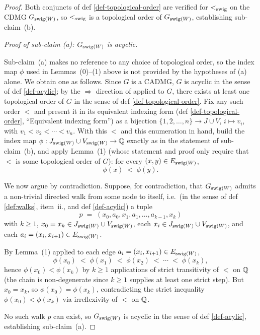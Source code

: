 \documentclass[main]{subfiles}
\begin{document}
\begin{proof}
Both conjuncts of def \ref{def-topological-order} are verified for $<_{\mathrm{swig}}$ on the CDMG $G_{\mathrm{swig}(W)}$, so $<_{\mathrm{swig}}$ is a topological order of $G_{\mathrm{swig}(W)}$, establishing sub-claim~(b).

\medskip\noindent\emph{Proof of sub-claim (a): $G_{\mathrm{swig}(W)}$ is acyclic.}

Sub-claim~(a) makes no reference to any choice of topological order, so the index map $\phi$ used in Lemmas~(0)--(1) above is not provided by the hypotheses of (a) alone. We obtain one as follows. Since $G$ is a CADMG, $G$ is acyclic in the sense of def \ref{def-acylic}; by the $\Rightarrow$ direction of  applied to $G$, there exists at least one topological order of $G$ in the sense of def \ref{def-topological-order}. Fix any such order $<$ and present it in its equivalent indexing form (def \ref{def-topological-order}, ``Equivalent indexing form'') as a bijection $\{1, 2, \dots, n\} \to J \cup V$, $i \mapsto v_i$, with $v_1 < v_2 < \cdots < v_n$. With this $<$ and this enumeration in hand, build the index map $\phi : J_{\mathrm{swig}(W)} \cup V_{\mathrm{swig}(W)} \to \mathbb{Q}$ exactly as in the statement of sub-claim~(b), and apply Lemma~(1) (whose statement and proof only require that $<$ is some topological order of $G$): for every $(x, y) \in E_{\mathrm{swig}(W)}$,
\[
    \phi(x) \;<\; \phi(y).
\]

We now argue by contradiction. Suppose, for contradiction, that $G_{\mathrm{swig}(W)}$ admits a non-trivial directed walk from some node to itself, i.e.\ (in the sense of def \ref{def:walks}, item~ii., and def \ref{def-acylic}) a tuple
\[
    p \;=\; (x_0, a_0, x_1, a_1, \dots, a_{k-1}, x_k)
\]
with $k \ge 1$, $x_0 = x_k \in J_{\mathrm{swig}(W)} \cup V_{\mathrm{swig}(W)}$, each $x_i \in J_{\mathrm{swig}(W)} \cup V_{\mathrm{swig}(W)}$, and each $a_i = (x_i, x_{i+1}) \in E_{\mathrm{swig}(W)}$.

By Lemma~(1) applied to each edge $a_i = (x_i, x_{i+1}) \in E_{\mathrm{swig}(W)}$,
\[
    \phi(x_0) \;<\; \phi(x_1) \;<\; \phi(x_2) \;<\; \cdots \;<\; \phi(x_k),
\]
hence $\phi(x_0) < \phi(x_k)$ by $k \ge 1$ applications of strict transitivity of $<$ on $\mathbb{Q}$ (the chain is non-degenerate since $k \ge 1$ supplies at least one strict step). But $x_0 = x_k$, so $\phi(x_0) = \phi(x_k)$, contradicting the strict inequality $\phi(x_0) < \phi(x_k)$ via irreflexivity of $<$ on $\mathbb{Q}$.

No such walk $p$ can exist, so $G_{\mathrm{swig}(W)}$ is acyclic in the sense of def \ref{def-acylic}, establishing sub-claim~(a).


\end{proof}
\end{document}
